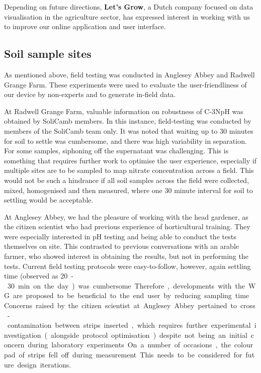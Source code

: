    Depending on future directions, \textbf{Let's Grow}, a Dutch company focused on data visualisation in the agriculture sector, has expressed interest in working with us to improve our online application and user interface.

    
    \subsection{Soil sample sites}\label{Sample Sites} 
    As mentioned above, field testing was conducted in Anglesey Abbey and Radwell Grange Farm. These experiments were used to evaluate the user-friendliness of our device by non-experts and to generate in-field data.
    
    
   At Radwell Grange Farm, valuable information on robustness of C-3NpH was obtained by SoliCamb members. In this instance, field-testing was conducted by members of the SoliCamb team only. It was noted that waiting up to 30 minutes for soil to settle was cumbersome, and there was high variability in separation. For some samples, siphoning off the supernatant was challenging. This is something that requires further work to optimise the user experience, especially if multiple sites are to be sampled to map nitrate concentration across a field. This would not be such a hindrance if all soil samples across the field were collected, mixed, homogenised and then measured, where one 30 minute interval for soil to settling would be acceptable.
   
  At Anglesey Abbey, we had the pleasure of working with the head gardener,  as the citizen scientist who had previous experience of horticultural training. They were  especially interested in pH testing and being able to conduct the tests themselves on site. This contrasted to previous conversations with an arable farmer, who showed interest in obtaining the results, but not in performing the tests. Current field testing protocols were easy-to-follow, however, again settling time (observed as \SI{20}-\SI{30}{\minute} on the day) was cumbersome. Therefore, developments with the WG are proposed to be beneficial to the end user by reducing sampling time. Concerns raised by the citizen scientist at Anglesey Abbey pertained to cross-contamination between strips inserted, which requires further experimental investigation (alongside protocol optimisation) despite not being an initial concern during laboratory experiments. On a number of occasions, the colour pad of strips fell off during measurement. This needs to be considered for future design iterations. 
  
